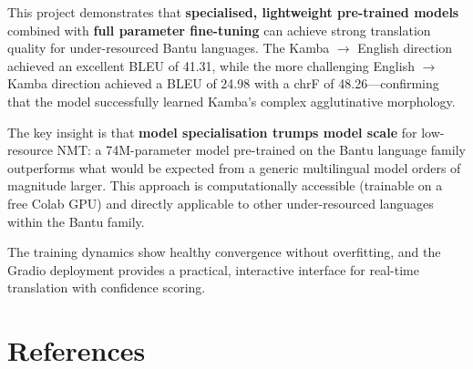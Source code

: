 \documentclass[12pt,a4paper]{article}
\begin{document}
This project demonstrates that \textbf{specialised, lightweight pre-trained models} combined with \textbf{full parameter fine-tuning} can achieve strong translation quality for under-resourced Bantu languages. The Kamba $\rightarrow$ English direction achieved an excellent BLEU of 41.31, while the more challenging English $\rightarrow$ Kamba direction achieved a BLEU of 24.98 with a chrF of 48.26---confirming that the model successfully learned Kamba's complex agglutinative morphology.

The key insight is that \textbf{model specialisation trumps model scale} for low-resource NMT: a 74M-parameter model pre-trained on the Bantu language family outperforms what would be expected from a generic multilingual model orders of magnitude larger. This approach is computationally accessible (trainable on a free Colab GPU) and directly applicable to other under-resourced languages within the Bantu family.

The training dynamics show healthy convergence without overfitting, and the Gradio deployment provides a practical, interactive interface for real-time translation with confidence scoring.

\section*{References}
\end{document}
